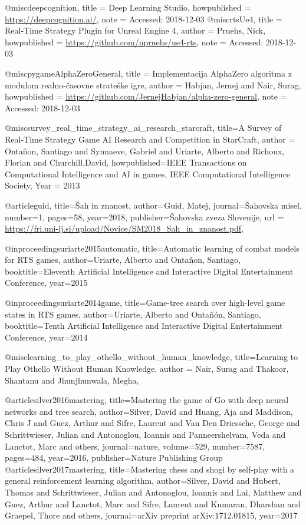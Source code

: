 @misc{deepcognition,
  title = {Deep Learning Studio},
  howpublished = {\url{https://deepcognition.ai/}},
  note = {Accessed: 2018-12-03}
}
@misc{rtsUe4,
  title = {Real-Time Strategy Plugin for Unreal Engine 4},
author = {Pruehs, Nick},
  howpublished = {\url{https://github.com/npruehs/ue4-rts}},
  note = {Accessed: 2018-12-03}
}




@misc{pygameAlphaZeroGeneral,
  title = {Implementacija AlphaZero algoritma z modulom realno-časovne strateške igre},
author = {Habjan, Jernej and Nair, Surag},
  howpublished = {\url{https://github.com/JernejHabjan/alpha-zero-general}},
  note = {Accessed: 2018-12-03}
}

@misc{survey_real_time_strategy_ai_research_starcraft,
title={A Survey of Real-Time Strategy Game AI Research and Competition in StarCraft},
author = {Ontañon, Santiago and Synnaeve, Gabriel and Uriarte, Alberto and Richoux, Florian and Churchill,David},
howpublished={IEEE Transactions on Computational Intelligence and AI in games, IEEE Computational Intelligence Society},
Year = 2013
}

@article{guid,
  title={Šah in znanost},
  author={Guid, Matej},
  journal={Šahovska misel},
  number={1},
  pages={58},
  year={2018},
  publisher={Šahovska zveza Slovenije},
  url = {\url{https://fri.uni-lj.si/upload/Novice/SM2018_Sah_in_znanost.pdf}},
}


@inproceedings{uriarte2015automatic,
  title={Automatic learning of combat models for RTS games},
  author={Uriarte, Alberto and Ontañon, Santiago},
  booktitle={Eleventh Artificial Intelligence and Interactive Digital Entertainment Conference},
  year={2015}
}

@inproceedings{uriarte2014game,
  title={Game-tree search over high-level game states in RTS games},
  author={Uriarte, Alberto and Onta{\~n}{\'o}n, Santiago},
  booktitle={Tenth Artificial Intelligence and Interactive Digital Entertainment Conference},
  year={2014}
}

@misc{learning_to_play_othello_without_human_knowledge,
title={Learning to Play Othello Without Human Knowledge},
author = {Nair, Surag and Thakoor, Shantanu and Jhunjhunwala, Megha},
}

@article{silver2016mastering,
  title={Mastering the game of Go with deep neural networks and tree search},
  author={Silver, David and Huang, Aja and Maddison, Chris J and Guez, Arthur and Sifre, Laurent and Van Den Driessche, George and Schrittwieser, Julian and Antonoglou, Ioannis and Panneershelvam, Veda and Lanctot, Marc and others},
  journal={nature},
  volume={529},
  number={7587},
  pages={484},
  year={2016},
  publisher={Nature Publishing Group}
}
@article{silver2017mastering,
  title={Mastering chess and shogi by self-play with a general reinforcement learning algorithm},
  author={Silver, David and Hubert, Thomas and Schrittwieser, Julian and Antonoglou, Ioannis and Lai, Matthew and Guez, Arthur and Lanctot, Marc and Sifre, Laurent and Kumaran, Dharshan and Graepel, Thore and others},
  journal={arXiv preprint arXiv:1712.01815},
  year={2017}
}


